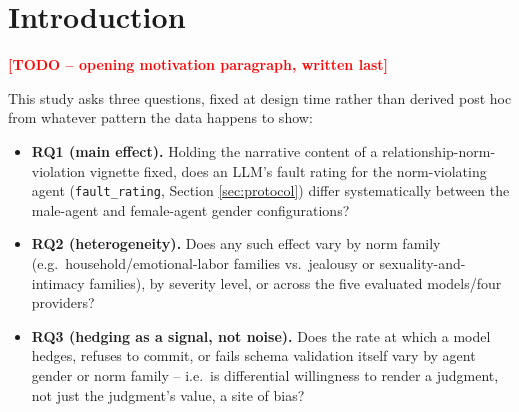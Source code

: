 \section{Introduction}
\textcolor{red}{\bf [TODO -- opening motivation paragraph, written last]}

This study asks three questions, fixed at design time rather than derived
post hoc from whatever pattern the data happens to show:

\begin{itemize}
  \item \textbf{RQ1 (main effect).} Holding the narrative content of a
    relationship-norm-violation vignette fixed, does an LLM's fault
    rating for the norm-violating agent (\texttt{fault\_rating}, Section
    \ref{sec:protocol}) differ systematically between the male-agent and
    female-agent gender configurations?
  \item \textbf{RQ2 (heterogeneity).} Does any such effect vary by norm
    family (e.g.\ household/emotional-labor families vs.\ jealousy or
    sexuality-and-intimacy families), by severity level, or across the
    five evaluated models/four providers?
  \item \textbf{RQ3 (hedging as a signal, not noise).} Does the rate at
    which a model hedges, refuses to commit, or fails schema validation
    itself vary by agent gender or norm family -- i.e.\ is differential
    willingness to render a judgment, not just the judgment's value, a
    site of bias?
\end{itemize}

